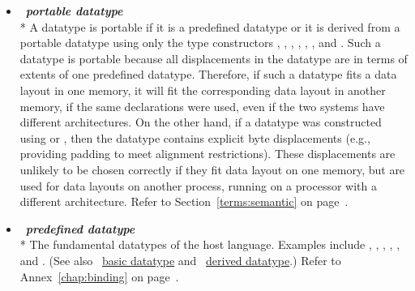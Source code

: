\begin{itemize}
\label{glossary:portable_datatype}
\item  ~\hypertarget{glossary:portable_datatype}{\emph{\textbf{portable datatype}}} \\*
A datatype is portable if it is a predefined datatype or it is derived
from a portable datatype using only the type constructors
, ,
,
,
, , and
.
Such a datatype is portable because all displacements in the datatype
are in terms of extents of one predefined datatype.  Therefore, if such a
datatype fits a data layout in one memory, it will fit the
corresponding data layout in another memory, if the same declarations
were used, even if the two systems have different architectures.  On
the other hand, if a datatype was constructed using
 or , 
then the datatype contains explicit byte
displacements (e.g., providing padding to meet alignment restrictions).
These displacements are unlikely to be chosen correctly if they fit
data layout on one memory, but are used for data layouts on another
process, running on a processor with a different architecture.
Refer to Section~\ref{terms:semantic} on page~\pageref{terms:semantic}.

\label{glossary:predefined_datatype}
\item  ~\hypertarget{glossary:predefined_datatype}{\emph{\textbf{predefined datatype}}} \\*
The fundamental datatypes of the host language. Examples include
,
,
,
,
, and
.
(See also ~\hyperlink{glossary:basic_datatype}{basic datatype} and
~\hyperlink{glossary:derived_datatype}{derived datatype}.)
Refer to Annex~\ref{chap:binding} on page~\pageref{chap:binding}.


\end{itemize}
